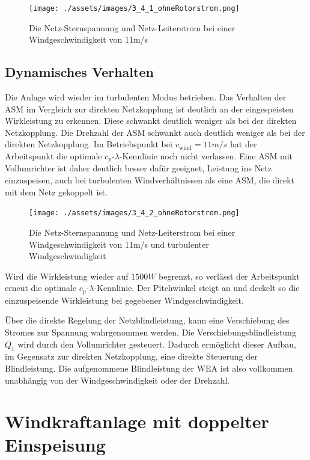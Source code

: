 \documentclass{report}
\begin{document}
\begin{figure}[!ht]
  \centering
  \texttt{[image: ./assets/images/3\_4\_1\_ohneRotorstrom.png]}
  \caption{Die Netz-Sternspannung und Netz-Leiterstrom bei einer Windgeschwindigkeit von 11m/s}
  \label{fig:oszi_umrichter}
\end{figure}

\subsection{Dynamisches Verhalten}

Die Anlage wird wieder im turbulenten Modus betrieben. Das Verhalten der ASM im Vergleich zur direkten Netzkopplung ist deutlich an der eingespeisten Wirkleistung zu erkennen. Diese schwankt deutlich weniger als bei der direkten Netzkopplung. Die Drehzahl der ASM schwankt auch deutlich weniger als bei der direkten Netzkopplung. Im Betriebspunkt bei $v_{\mathrm{wind}} = 11m/s$ hat der Arbeitspunkt die optimale $c_{p}$-$\lambda$-Kennlinie noch nicht verlassen. Eine ASM mit Vollumrichter ist daher deutlich besser dafür geeignet, Leistung ins Netz einzuspeisen, auch bei turbulenten Windverhältnissen als eine ASM, die direkt mit dem Netz gekoppelt ist.

\begin{figure}[!ht]
  \centering
  \texttt{[image: ./assets/images/3\_4\_2\_ohneRotorstrom.png]}
  \caption{Die Netz-Sternspannung und Netz-Leiterstrom bei einer Windgeschwindigkeit von 11m/s und turbulenter Windgeschwindigkeit}
  \label{fig:oszi_umrichter_turbulent}
\end{figure}

Wird die Wirkleistung wieder auf $1500W$ begrenzt, so verlässt der Arbeitspunkt erneut die optimale $c_{p}$-$\lambda$-Kennlinie. Der Pitchwinkel steigt an und deckelt so die einzuspeisende Wirkleistung bei gegebener Windgeschwindigkeit.

Über die direkte Regelung der Netzblindleistung, kann eine Verschiebung des Stromes zur Spannung wahrgenommen werden. Die Verschiebungsblindleistung $Q_{1}$ wird durch den Vollumrichter gesteuert. Dadurch ermöglicht dieser Aufbau, im Gegensatz zur direkten Netzkopplung, eine direkte Steuerung der Blindleistung. Die aufgenommene Blindleistung der WEA ist also vollkommen unabhängig von der Windgeschwindigkeit oder der Drehzahl.

\section{Windkraftanlage mit doppelter Einspeisung}
\label{sec:windkr-mit-dopp}
\end{document}
